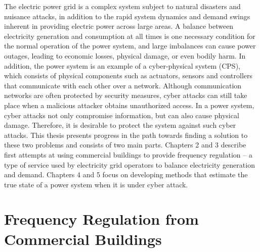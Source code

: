 \documentclass[../thesis.tex]{subfiles}
\begin{document}
The electric power grid is a complex system subject to natural disasters and nuisance attacks, in addition to the rapid system dynamics and demand swings inherent in providing electric power across large areas.
A balance between electricity generation and consumption at all times is one necessary condition for the normal operation of the power system, and large imbalances can cause power outages, leading to economic losses, physical damage, or even bodily harm.
In addition, the power system is an example of a cyber-physical system (CPS), which consists of physical components such as actuators, sensors and controllers that communicate with each other over a network. 
Although communication networks are often protected by security measures, cyber attacks can still take place when a malicious attacker obtains unauthorized access. %
In a power system, cyber attacks not only compromise information, but can also cause physical damage. 
Therefore, it is desirable to protect the system against such cyber attacks.
This thesis presents progress in the path towards finding a solution to these two problems and consists of two main parts.
Chapters 2 and 3 describe first attempts at using commercial buildings to provide frequency regulation -- a type of service used by electricity grid operators to balance electricity generation and demand. 
Chapters 4 and 5 focus on developing methods that estimate the true state of a power system when it is under cyber attack.




\section{Frequency Regulation from Commercial Buildings}
\end{document}
